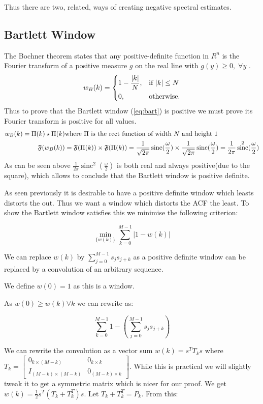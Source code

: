 \documentclass[10pt,twoside,a4paper]{report}
\DeclareMathOperator{\sinc}{sinc}
\begin{document}
Thus there are two, related, ways of creating negative spectral estimates.


\subsection{Bartlett Window}
The Bochner theorem states that any  positive-definite function in $R^n$ is the Fourier transform of a positive measure $g$ on the real line with $g(y) \geq 0, \; \forall y$ .\cite{lofi} 
\begin{equation}
    w_B(k)= 
\begin{dcases}
    1-\frac{|k|}{N},& \text{if } |k|\leq N\\
    0,              & \text{otherwise.}
\end{dcases}
\label{eq:bart}
\end{equation}
Thus to prove that the Bartlett window (\ref{eq:bart}) is positive we must prove its Fourier transform is positive for all values.
\begin{align*}
w_B(k) = \Pi(k) \star \Pi(k) &
\hfill \text{\hfill where $\Pi$ is the rect function of width $N$ and height 1} \\
\mathfrak{F}(w_B(k)) &= \mathfrak{F}(\Pi(k)) \times \mathfrak{F}(\Pi(k)) = \frac{1}{\sqrt{2\pi}} \sinc(\frac{\omega}{2}) \times \frac{1}{\sqrt{2\pi}} \sinc(\frac{\omega}{2}) = \frac{1}{2\pi} \sinc^2 (\frac{\omega}{2})
\end{align*}
As can be seen above $\frac{1}{2\pi} \sinc^2 (\frac{\omega}{2})$ is both real and always positive(due to the square), which allows to conclude that the Bartlett window is positive definite.


As seen previously it is desirable to have a positive definite window which leasts distorts the out. Thus we want a window which distorts the ACF the least. To show the Bartlett window satisfies this we minimise the following criterion:


$$ \min_{\{w(k)\}} \sum_{k=0}^{M-1} |1-w(k)|$$

We can replace $\displaystyle w(k)$ by $\sum_{j=0}^{M-1} s_j s_{j+k}$ as a positive definite window can be replaced by a convolution of an arbitrary sequence.

We define $w(0)=1$ as this is a window.

As $w(0) \geq w(k) \forall k$ we can rewrite as:

$$ \sum_{k=0}^{M-1} 1- \left( \sum_{j=0}^{M-1} s_j s_{j+k} \right) $$


We can rewrite the convolution as a vector sum $w(k) = s^T T_k s$ where $T_k = \begin{bmatrix} 0_{k \times (M-k)} & 0_{k\times k} \\ I_{(M-k)\times (M-k)} & 0_{(M-k) \times k} \end{bmatrix}$. While this is practical we will slightly tweak it to get a symmetric matrix which is nicer for our proof. We get $w(k) = \frac{1}{2} s^T (T_k +T_k^T) s$. Let $T_k +T_k^T = P_k$. From this:
\end{document}
